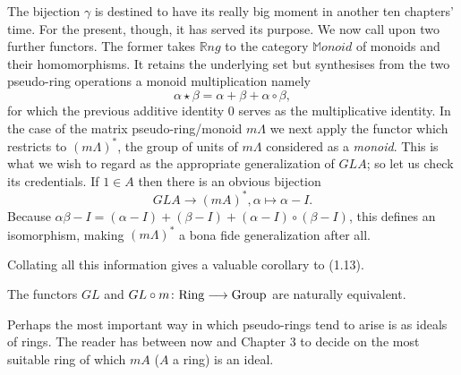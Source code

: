 The bijection $\gamma$ is destined to have its really big moment in another ten chapters' time. For the present, though, it has served its purpose. We now call upon two further functors. The former takes $ \mathbb{R}ng$ to the category $\mathbb{M}onoid$ of monoids and their homomorphisms. It retains the underlying set but synthesises from the two pseudo-ring operations a monoid multiplication namely 
\[\alpha \star \beta=\alpha+\beta+\alpha\circ \beta,\]
for which the previous additive identity $0$ serves as the multiplicative identity. In the case of the matrix pseudo-ring/monoid $m\Lambda$ we next apply the functor which restricts to $(m\Lambda)^*$, the group of units of $m\Lambda$ considered as a {\em monoid}. This is what we wish to regard as the appropriate generalization of $GLA$; so let us check its credentials. If $1\in A$ then there is an obvious bijection
\[GLA\longrightarrow (mA)^*,\alpha\mapsto \alpha-I.\]
Because $\alpha\beta-I=(\alpha-I)+(\beta-I)+(\alpha-I)\circ(\beta-I)$, this defines an isomorphism, making $(m\Lambda)^*$ a bona fide generalization after all.

Collating all this information gives a valuable corollary to (1.13).
\begin{prop}
The functors $GL$ and $GL\circ m\colon  {\rm Ring}\longrightarrow{\rm Group}$ are naturally equivalent.
\end{prop}
Perhaps the most important way in which pseudo-rings tend to arise is as ideals of rings. The reader has between now and Chapter 3 to decide on the most suitable ring of which $mA$ ($A$ a ring) is an ideal.
